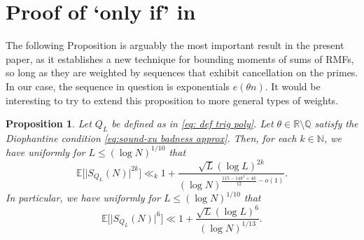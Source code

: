 \documentclass[12pt]{amsart}
\renewcommand{\le}{\leqslant}
\numberwithin{equation}{section}
\theoremstyle{plain}
\newtheorem{prop}[thm]{Proposition}
\theoremstyle{definition}
\newcommand{\N}{\mathbb{N}}
\newcommand{\Q}{\mathbb{Q}}
\newcommand{\R}{\mathbb{R}}
\newcommand{\E}{\mathbb{E}}
\begin{document}
	\section{Proof of `only if' in }\label{sec: proof only if}
	The following Proposition is arguably the most important result in the present paper, as it establishes a new technique for bounding moments of sums of RMFs, so long as they are weighted by sequences that exhibit cancellation on the primes. In our case, the sequence in question is exponentials $e(\theta n)$. It would be interesting to try to extend this proposition to more general types of weights.
	\begin{prop}\label{thm: bounded moments}
		Let $Q_L$ be defined as in \eqref{eq: def trig poly}. Let $\theta \in \R\setminus\Q$ satisfy the Diophantine condition \eqref{eq:sound-xu badness approx}. Then, for each $k \in \N$, we have uniformly for $L \le (\log N)^{1/10}$ that
		$$\E\Big[\big|S_{Q_L}(N)\big|^{2k}\Big] \ll_k 1 +\frac{\sqrt{L}(\log L)^{2k}}{(\log N)^{\frac{115 - 14k^2 + 4k}{12} - o(1)}}.$$
		In particular, we have uniformly for $L \le (\log N)^{1/10}$ that 
		$$\E\big[\big|S_{Q_L}(N)\big|^{6}\big] \ll 1  + \frac{\sqrt{L}(\log L)^6 }{(\log N)^{1/13}}.$$
	\end{prop}
\end{document}
